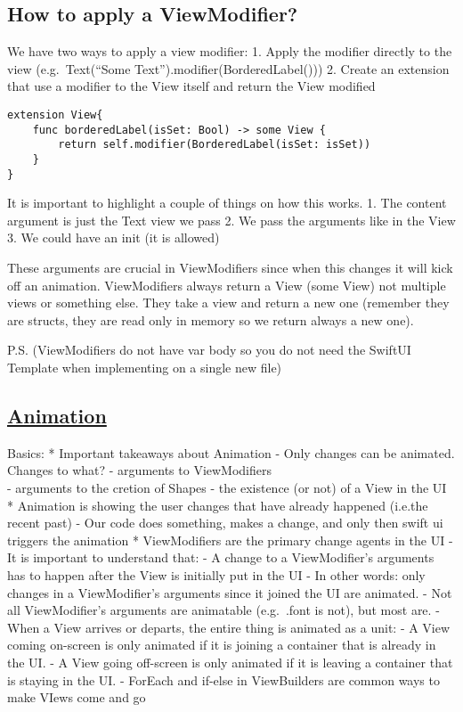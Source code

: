 \documentclass[]{article}
\begin{document}
\hypertarget{how-to-apply-a-viewmodifier}{%
\subsection{How to apply a
ViewModifier?}\label{how-to-apply-a-viewmodifier}}

We have two ways to apply a view modifier: 1. Apply the modifier
directly to the view (e.g.~Text(``Some
Text'').modifier(BorderedLabel())) 2. Create an extension that use a
modifier to the View itself and return the View modified

\begin{verbatim}
extension View{
    func borderedLabel(isSet: Bool) -> some View {
        return self.modifier(BorderedLabel(isSet: isSet))
    }
}
\end{verbatim}

It is important to highlight a couple of things on how this works. 1.
The content argument is just the Text view we pass 2. We pass the
arguments like in the View 3. We could have an init (it is allowed)

These arguments are crucial in ViewModifiers since when this changes it
will kick off an animation. ViewModifiers always return a View (some
View) not multiple views or something else. They take a view and return
a new one (remember they are structs, they are read only in memory so we
return always a new one).

P.S. (ViewModifiers do not have var body so you do not need the SwiftUI
Template when implementing on a single new file)

\hypertarget{animation-1}{%
\subsection{\texorpdfstring{\href{https://www.youtube.com/watch?v=PoeaUMGAx6c}{Animation}}{Animation}}\label{animation-1}}

Basics: * Important takeaways about Animation - Only changes can be
animated. Changes to what? - arguments to ViewModifiers\\
- arguments to the cretion of Shapes - the existence (or not) of a View
in the UI * Animation is showing the user changes that have already
happened (i.e.the recent past) - Our code does something, makes a
change, and only then swift ui triggers the animation * ViewModifiers
are the primary change agents in the UI - It is important to understand
that: - A change to a ViewModifier's arguments has to happen after the
View is initially put in the UI - In other words: only changes in a
ViewModifier's arguments since it joined the UI are animated. - Not all
ViewModifier's arguments are animatable (e.g.~.font is not), but most
are. - When a View arrives or departs, the entire thing is animated as a
unit: - A View coming on-screen is only animated if it is joining a
container that is already in the UI. - A View going off-screen is only
animated if it is leaving a container that is staying in the UI. -
ForEach and if-else in ViewBuilders are common ways to make VIews come
and go
\end{document}
